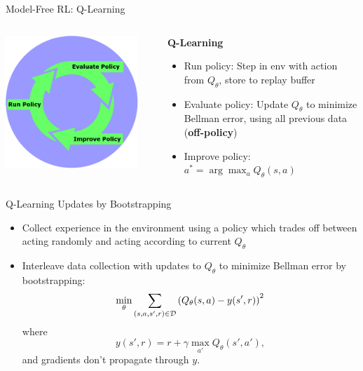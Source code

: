 \documentclass[9pt]{beamer}
\begin{document}
\begin{frame}{Model-Free RL: Q-Learning}


\begin{columns}
\begin{column}{0.33\textwidth}
\includegraphics[width=0.9\textwidth]{rl_loop}
\end{column}
\begin{column}{0.67\textwidth}
\textbf{Q-Learning}
\begin{itemize}
\item Run policy: Step in env with action from $Q_{\theta}$, store to replay buffer
\item Evaluate policy: Update $Q_{\theta}$ to minimize Bellman error, using all previous data (\textbf{off-policy})
\item Improve policy: $a^* = \arg \max_{a} Q_{\theta}(s,a)$
\end{itemize}
\end{column}
\end{columns}
\end{frame}


\begin{frame}{Q-Learning Updates by Bootstrapping}

\begin{itemize}
\item Collect experience in the environment using a policy which trades off between acting randomly and acting according to current $Q_{\theta}$
\item Interleave data collection with updates to $Q_{\theta}$ to minimize Bellman error by bootstrapping:
%
\begin{equation*}
\min_{\theta} \sum_{(s,a,s',r)\in {\mathcal D}} \left(Q_{\theta}(s,a) - y(s',r) \right)^2
\end{equation*}
%
where
\begin{equation*}
y(s',r) = r + \gamma \max_{a'} Q_{\theta}(s',a'),
\end{equation*}
%
and gradients don't propagate through $y$.
\end{itemize}


\end{frame}
\end{document}
